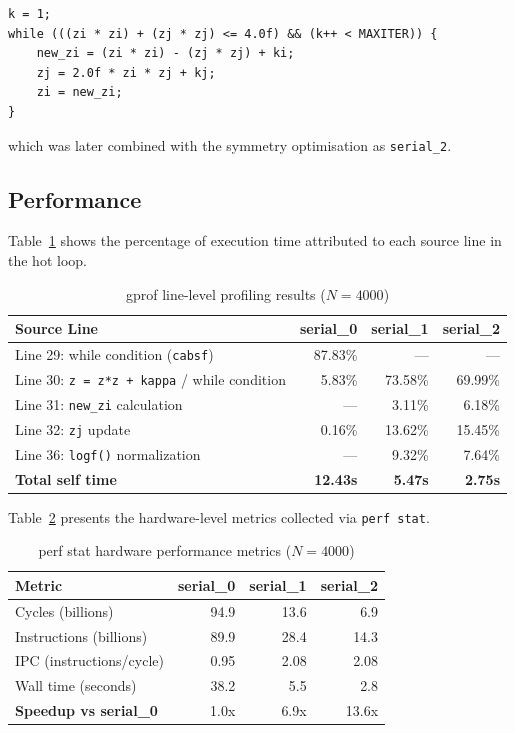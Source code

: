 \documentclass[11pt,a4paper]{article}
\begin{document}
\begin{lstlisting}[firstnumber=29]
k = 1;
while (((zi * zi) + (zj * zj) <= 4.0f) && (k++ < MAXITER)) { 
    new_zi = (zi * zi) - (zj * zj) + ki;
    zj = 2.0f * zi * zj + kj;
    zi = new_zi;
}
\end{lstlisting}
which was later combined with the symmetry optimisation as \texttt{serial\_2}.

\subsection{Performance}

Table~\ref{tab:serial_gprof} shows the percentage of execution time attributed to each source line in the hot loop.

\begin{table}[h]
\centering
\begin{tabular}{@{}lrrr@{}}
\toprule
\textbf{Source Line} & \textbf{serial\_0} & \textbf{serial\_1} & \textbf{serial\_2} \\
\midrule
Line 29: while condition (\texttt{cabsf}) & 87.83\% & --- & --- \\
Line 30: \texttt{z = z*z + kappa} / while condition & 5.83\% & 73.58\% & 69.99\% \\
Line 31: \texttt{new\_zi} calculation & --- & 3.11\% & 6.18\% \\
Line 32: \texttt{zj} update & 0.16\% & 13.62\% & 15.45\% \\
Line 36: \texttt{logf()} normalization & --- & 9.32\% & 7.64\% \\
\midrule
\textbf{Total self time} & \textbf{12.43s} & \textbf{5.47s} & \textbf{2.75s} \\
\bottomrule
\end{tabular}
\caption{gprof line-level profiling results ($N = 4000$)}
\label{tab:serial_gprof}
\end{table}

Table~\ref{tab:serial_perf} presents the hardware-level metrics collected 
via \texttt{perf stat}.

\begin{table}[h]
\centering
\begin{tabular}{@{}lrrr@{}}
\toprule
\textbf{Metric} & \textbf{serial\_0} & \textbf{serial\_1} & \textbf{serial\_2} \\
\midrule
Cycles (billions) & 94.9 & 13.6 & 6.9 \\
Instructions (billions) & 89.9 & 28.4 & 14.3 \\
IPC (instructions/cycle) & 0.95 & 2.08 & 2.08 \\
Wall time (seconds) & 38.2 & 5.5 & 2.8 \\
\midrule
\textbf{Speedup vs serial\_0} & {1.0x} & {6.9x} & {13.6x} \\
\bottomrule
\end{tabular}
\caption{perf stat hardware performance metrics ($N = 4000$)}
\label{tab:serial_perf}
\end{table}
\end{document}
